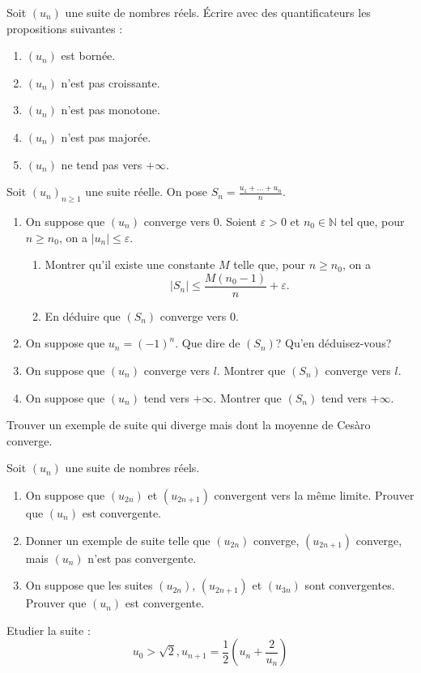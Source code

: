 \documentclass{book}
\begin{document}
\begin{Exercice}
Soit $(u_n)$ une suite de nombres réels. \'Ecrire avec des quantificateurs les propositions suivantes : 
\begin{enumerate}
\item $(u_n)$ est bornée.
\item $(u_n)$ n'est pas croissante.
\item $(u_n)$ n'est pas monotone.
\item $(u_n)$ n'est pas majorée.
\item $(u_n)$ ne tend pas vers $+\infty$.
\end{enumerate}
\end{Exercice}

\begin{Exercice}
Soit $(u_n)_{n\geq 1}$ une suite réelle. On pose $S_n=\frac{u_1+\dots+u_n}{n}$.
\begin{enumerate}
\item On suppose que $(u_n)$ converge vers 0. Soient $\varepsilon>0$ et $n_0\in\mathbb N$ tel que, pour
$n\geq n_0$, on a $|u_n|\leq\varepsilon$.
\begin{enumerate}
\item Montrer qu'il existe une constante $M$ telle que, pour $n\geq n_0$, on a 
$$|S_n|\leq \frac{M(n_0-1)}{n}+\varepsilon.$$
\item En déduire que $(S_n)$ converge vers 0.
\end{enumerate}
\item On suppose que $u_n=(-1)^n$. Que dire de $(S_n)$? Qu'en déduisez-vous?
\item On suppose que $(u_n)$ converge vers $l$. Montrer que $(S_n)$ converge vers $l$.
\item On suppose que $(u_n)$ tend vers $+\infty$. Montrer que $(S_n)$ tend vers $+\infty$.
\end{enumerate}
\item Trouver un exemple de suite qui diverge mais dont la moyenne de Cesàro converge.
\end{Exercice}

\begin{Exercice}
Soit $(u_n)$ une suite de nombres réels.
\begin{enumerate}
\item On suppose que $(u_{2n})$ et $(u_{2n+1})$ convergent vers la même limite. Prouver que $(u_n)$ est convergente.
\item Donner un exemple de suite telle que $(u_{2n})$ converge, $(u_{2n+1})$ converge, mais $(u_{n})$ n'est pas convergente.
\item On suppose que les suites $(u_{2n})$, $(u_{2n+1})$ et $(u_{3n})$ sont convergentes. Prouver que $(u_n)$ est convergente.
\end{enumerate}
\end{Exercice}


\begin{Exercice}
Etudier la suite :
  $$u_0 > \sqrt{2} , u_{n+1} = \frac12\left(u_n + \frac{2}{u_n}\right)$$
\end{Exercice}
\end{document}
